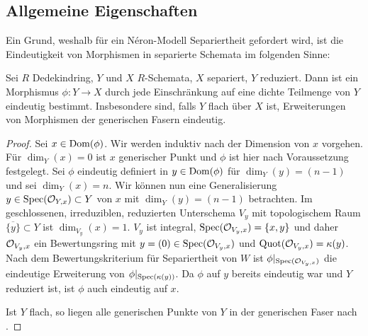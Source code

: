 \documentclass[german]{scrreprt}
\begin{document}
\subsection{Allgemeine Eigenschaften}
Ein Grund, weshalb für ein Néron-Modell Separiertheit gefordert wird,
ist die Eindeutigkeit von Morphismen in separierte Schemata im
folgenden Sinne:
\begin{Satz}\label{thm:erweindeutig}
  \cite[Corollary 9.9]{wedhorn}
  Sei $R$ Dedekindring, $Y$ und $X$ $R$-Schemata, $X$ separiert, $Y$
  reduziert.
  Dann ist ein Morphismus $\phi\colon Y\to X$ durch jede
  Einschränkung auf eine dichte Teilmenge von $Y$ eindeutig bestimmt.
  Insbesondere sind, falls $Y$ flach über $X$ ist, Erweiterungen von
  Morphismen der generischen Fasern eindeutig.
  \begin{proof}
    Sei $x\in\operatorname{Dom}(\phi)$.
    Wir werden induktiv nach der Dimension von $x$ vorgehen. Für
    $\dim_Y(x)=0$ ist $x$ generischer Punkt und $\phi$ ist hier nach
    Voraussetzung festgelegt.
    Sei $\phi$ eindeutig definiert in $y\in\operatorname{Dom}(\phi)$ für
    $\dim_Y(y)=(n-1)$ und sei $\dim_Y(x)=n$.
    Wir können nun eine Generalisierung $y\in\operatorname{Spec}(\mathcal{O}_{Y,x})\subset Y$
    von $x$ mit $\dim_Y(y)=(n-1)$ betrachten.
    Im geschlossenen, irreduziblen, reduzierten Unterschema $V_y$ mit
    topologischem Raum $\overline{\{y\}}\subset Y$ ist
    $\dim_{V_y}(x)=1$.
    $V_y$ ist integral, $\operatorname{Spec}(\mathcal{O}_{V_y,x})=\{x,y\}$ und daher 
    $\mathcal{O}_{V_y,x}$ ein Bewertungsring mit
    $y=(0)\in\operatorname{Spec}(\mathcal{O}_{V_y,x})$ und $\operatorname{Quot}(\mathcal{O}_{V_y,x})=\kappa(y)$.
    Nach dem Bewertungskriterium für Separiertheit von $W$ ist
    $\phi|_{\operatorname{Spec}(\mathcal{O}_{V_y,x})}$ die eindeutige Erweiterung von
    $\phi|_{\operatorname{Spec}(\kappa(y))}$. Da $\phi$ auf $y$ bereits eindeutig war
    und $Y$ reduziert ist, ist $\phi$ auch eindeutig auf $x$.

    Ist $Y$ flach, so liegen alle generischen Punkte von $Y$ in der
    generischen Faser nach \cite[Proposition III.9.7]{hartshorne}.
  \end{proof}
\end{Satz}
\end{document}
